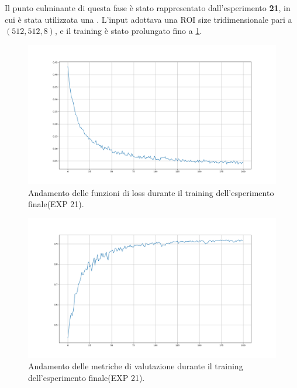 Il punto culminante di questa fase è stato rappresentato dall’esperimento \textbf{21}, in cui è stata utilizzata una . L’input adottava una ROI size tridimensionale pari a $(512, 512, 8)$, e il training è stato prolungato fino a  \ref{fig:losses}. 

\begin{minipage}{.48\textwidth}
    \begin{figure}[H] 
        \centering 
        \includegraphics[width=\textwidth]{figures/losses.png} 
        \caption{Andamento delle funzioni di loss durante il training dell’esperimento finale(EXP 21).}
        \label{fig:losses}
    \end{figure} 
\end{minipage}
\hfill
\begin{minipage}{.48\textwidth}
    \begin{figure}[H] 
        \centering 
        \includegraphics[width=\textwidth]{figures/metrics.png} 
        \caption{Andamento delle metriche di valutazione durante il training dell’esperimento finale(EXP 21).}
        \label{fig:metrics}
    \end{figure} 
\end{minipage}


